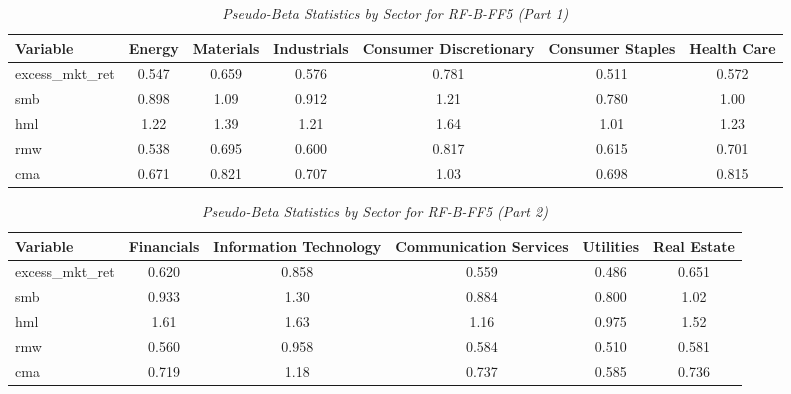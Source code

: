         \begin{table}[ht]
        \centering
        \caption{\textit{Pseudo-Beta Statistics by Sector for RF-B-FF5 (Part 1)}}
        \label{tab:rfi_statistics_1}
        \begin{tabular}{lcccccc}
        \toprule
        \textbf{Variable} & \textbf{Energy} & \textbf{Materials} & \textbf{Industrials} & \textbf{Consumer Discretionary} & \textbf{Consumer Staples} & \textbf{Health Care} \\
        \midrule
        excess\_mkt\_ret & 0.547 & 0.659 & 0.576 & 0.781 & 0.511 & 0.572 \\
smb & 0.898 & 1.09 & 0.912 & 1.21 & 0.780 & 1.00 \\
hml & 1.22 & 1.39 & 1.21 & 1.64 & 1.01 & 1.23 \\
rmw & 0.538 & 0.695 & 0.600 & 0.817 & 0.615 & 0.701 \\
cma & 0.671 & 0.821 & 0.707 & 1.03 & 0.698 & 0.815 \\
        \bottomrule
        \end{tabular}%
        \end{table}

        \begin{table}[ht]
        \centering
        \caption{\textit{Pseudo-Beta Statistics by Sector for RF-B-FF5 (Part 2)}}
        \label{tab:rfi_statistics_2}
        \begin{tabular}{lccccc}
        \toprule
        \textbf{Variable} & \textbf{Financials} & \textbf{Information Technology} & \textbf{Communication Services} & \textbf{Utilities} & \textbf{Real Estate} \\
        \midrule
        excess\_mkt\_ret & 0.620 & 0.858 & 0.559 & 0.486 & 0.651 \\
smb & 0.933 & 1.30 & 0.884 & 0.800 & 1.02 \\
hml & 1.61 & 1.63 & 1.16 & 0.975 & 1.52 \\
rmw & 0.560 & 0.958 & 0.584 & 0.510 & 0.581 \\
cma & 0.719 & 1.18 & 0.737 & 0.585 & 0.736 \\
        \bottomrule
        \end{tabular}%
        \end{table}